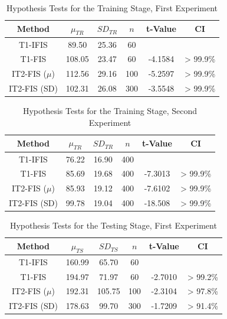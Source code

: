 \documentclass[conference]{IEEEtran}
\begin{document}
\begin{table}[!t]
  \renewcommand{\arraystretch}{1.3}
  \caption{Hypothesis Tests for the Training Stage, First Experiment}
  \label{first-hypothesis-tests-training}
  \centering
  \begin{tabular}{|c|c|c|c|c|c|}
    \hline
    Method & $\mu_{TR}$ & $SD_{TR}$ & $n$ & t-Value & CI \\
    \hline
    T1-IFIS & 89.50 & 25.36 & 60 &  & \\
    \hline
    T1-FIS & 108.05 & 23.47 & 60 & -4.1584 & > 99.9\% \\
    \hline
    IT2-FIS (\(\mu\)) & 112.56 & 29.16 & 100 & -5.2597 & > 99.9\% \\
    \hline
    IT2-FIS (SD) & 102.31 & 26.08 & 300 & -3.5548 & > 99.9\% \\
    \hline
  \end{tabular}
\end{table}

\begin{table}[!t]
  \renewcommand{\arraystretch}{1.3}
  \caption{Hypothesis Tests for the Training Stage, Second Experiment}
  \label{second-hypothesis-tests-training}
  \centering
  \begin{tabular}{|c|c|c|c|c|c|}
    \hline
    Method & $\mu_{TR}$ & $SD_{TR}$ & $n$ & t-Value & CI\\
    \hline
    T1-IFIS & 76.22 & 16.90 & 400 & & \\
    \hline
    T1-FIS & 85.69 & 19.68 & 400 & -7.3013 & > 99.9\% \\
    \hline
    IT2-FIS (\(\mu\)) & 85.93 & 19.12 & 400 & -7.6102 & > 99.9\%\\
    \hline
    IT2-FIS (SD) & 99.78 & 19.04 & 400 & -18.508 & > 99.9\% \\
    \hline
  \end{tabular}
\end{table}

\begin{table}[!t]
  \renewcommand{\arraystretch}{1.3}
  \caption{Hypothesis Tests for the Testing Stage, First Experiment}
  \label{first-hypothesis-tests-testing}
  \centering
  \begin{tabular}{|c|c|c|c|c|c|}
    \hline
    Method & $\mu_{TS}$ & $SD_{TS}$ & $n$ & t-Value & CI \\
    \hline
    T1-IFIS & 160.99 & 65.70 & 60 &  & \\
    \hline
    T1-FIS & 194.97 & 71.97 & 60 & -2.7010 & > 99.2\%\\
    \hline
    IT2-FIS (\(\mu\)) & 192.31 & 105.75 & 100 & -2.3104 & > 97.8\% \\
    \hline
    IT2-FIS (SD) & 178.63 & 99.70 & 300 & -1.7209 & > 91.4\% \\
    \hline
  \end{tabular}
\end{table}
\end{document}
